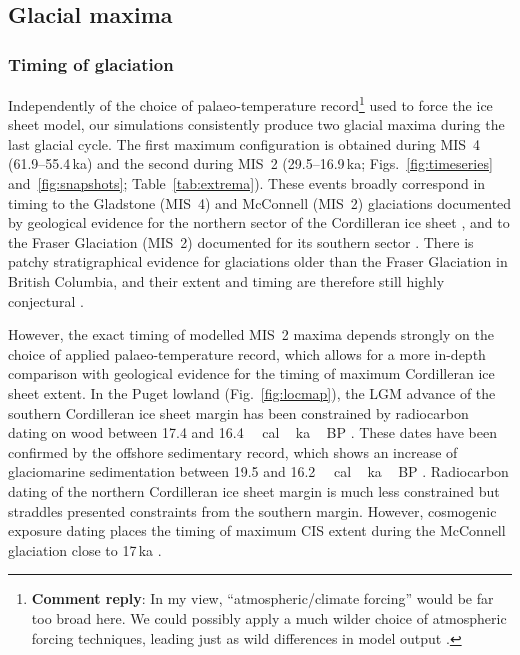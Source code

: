 \documentclass[tc, manuscript]{copernicus}
\newcommand{\renote}[1]{\footnote{\textbf{Comment reply}: #1}}
\begin{document}
\subsection{Glacial maxima}

\subsubsection{Timing of glaciation}

Independently of the choice of palaeo-temperature record\renote{
    In my view, ``atmospheric/climate forcing'' would be far too broad here. We
    could possibly apply a much wilder choice of atmospheric forcing
    techniques, leading just as wild differences in model output
    \citep[e.g.,][but possibly much more than that]{Seguinot.etal.2014}.}
used to force the ice sheet model, our simulations consistently produce two
glacial maxima during the last glacial cycle. The first maximum configuration
is obtained during MIS~4 (61.9--55.4\,ka) and the second during MIS~2
(29.5--16.9\,ka; Figs.~\ref{fig:timeseries} and~\ref{fig:snapshots};
Table~\ref{tab:extrema}). These events broadly correspond in timing to the
Gladstone
(MIS~4) and McConnell (MIS~2) glaciations documented by geological evidence for
the northern sector of the Cordilleran ice sheet
    \citep{Duk-Rodkin.etal.1996, Ward.etal.2007,
           Stroeven.etal.2010, Stroeven.etal.2014},
and to the Fraser Glaciation (MIS~2) documented for its southern sector
    \citep{Porter.Swanson.1998, Margold.etal.2014}.
There is patchy stratigraphical evidence for glaciations older than the Fraser
Glaciation \citep{Clague.Ward.2011} in British Columbia, and their extent and
timing are therefore still highly conjectural
    \citep[perhaps MIS~4 or early MIS~3; e.g.,][]{Cosma.etal.2008}.

However, the exact timing of modelled MIS~2 maxima depends strongly on the
choice of applied palaeo-temperature record, which allows for a more in-depth
comparison with geological evidence for the timing of maximum Cordilleran ice
sheet extent. In the Puget lowland (Fig.~\ref{fig:locmap}), the LGM advance of
the southern Cordilleran ice sheet margin has been constrained by radiocarbon
dating on wood between 17.4 and 16.4\,\unit{\,cal\,ka\,BP}
\citep{Porter.Swanson.1998}.
These dates have been confirmed by the offshore sedimentary record, which shows
an increase of glaciomarine sedimentation between 19.5 and
16.2\,\unit{\,cal\,ka\,BP} \citep{Cosma.etal.2008}. Radiocarbon
dating of the northern Cordilleran ice sheet margin is much less constrained
but straddles presented constraints from the southern margin. However,
cosmogenic exposure dating
places the timing of maximum CIS extent during the McConnell glaciation close
to 17\,ka \citep{Stroeven.etal.2010, Stroeven.etal.2014}.
\end{document}
